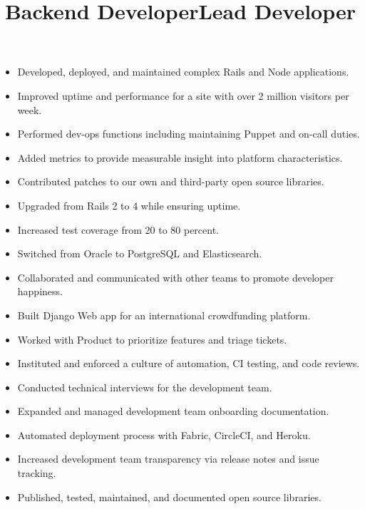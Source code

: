 \documentclass[line]{res}
\begin{document}
\begin{resume}
\begin{position}
\begin{itemize}
\end{itemize}
\end{position}

\title{Backend Developer}
\begin{position}
\noindent
\vspace {-10 pt}
\begin{itemize}

\item Developed, deployed, and maintained complex Rails and Node applications.
\item Improved uptime and performance for a site with over 2 million visitors per week.
\item Performed dev-ops functions including maintaining Puppet and on-call duties.
\item Added metrics to provide measurable insight into platform characteristics.
\item Contributed patches to our own and third-party open source libraries.
\item Upgraded from Rails 2 to 4 while ensuring uptime.
\item Increased test coverage from 20 to 80 percent.
\item Switched from Oracle to PostgreSQL and Elasticsearch.
\item Collaborated and communicated with other teams to promote developer happiness.

\end{itemize}
\end{position}

\title{Lead Developer}
\begin{position}
\noindent
\vspace {-10 pt}
\begin{itemize}

\item Built Django Web app for an international crowdfunding platform.
\item Worked with Product to prioritize features and triage tickets.
\item Instituted and enforced a culture of automation, CI testing, and code reviews.
\item Conducted technical interviews for the development team.
\item Expanded and managed development team onboarding documentation.
\item Automated deployment process with Fabric, CircleCI, and Heroku.
\item Increased development team transparency via release notes and issue tracking.
\item Published, tested, maintained, and documented open source libraries.


\end{itemize}
\end{position}
\end{resume}
\end{document}
